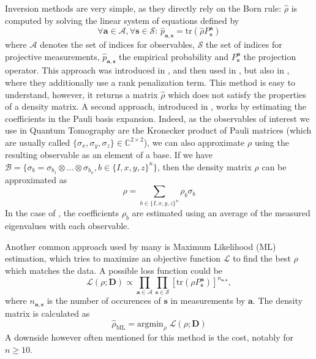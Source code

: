\documentclass[12pt]{memoir}
\newcommand{\tr}{\text{tr}}
\newcommand{\mb}{\mathbf}
\begin{document}
Inversion methods are very simple, as they directly rely on the Born rule: $\hat \rho$ is computed by solving the linear system of equations defined by 
\begin{equation*} \label{eq:inversion-method}
        \forall \mb a \in \mathcal{A},\forall \mb s \in \mathcal{S}: \, \hat p_{\mb a, \mb s} = \tr(\hat \rho P^{\mb a}_{\mb s})
\end{equation*}
where $\mathcal{A}$ denotes the set of indices for observables, $\mathcal{S}$ the set of indices for projective measurements, $\hat p_{\mb a,\mb s}$ the empirical probability and $P^{\mb a}_{\mb s}$ the projection operator. This approach was introduced in \cite{meth:linear-inversion:vogel-risken}, and then used in \cite{meth:linear-inversion:RMH}, but also in \cite{meth:linear-inversion:alquier}, where they additionally use a rank penalization term. This method is easy to understand, however, it returns a matrix $\hat \rho$ which does not satisfy the properties of a density matrix.\medbreak
A second approach, introduced in \cite{Cai-2016}, works by estimating the coefficients in the Pauli basis expansion. Indeed, as the observables of interest we use in Quantum Tomography are the Kronecker product of Pauli matrices (which are usually called $\{\sigma_x, \sigma_y, \sigma_z\} \in \mathbb{C}^{2\times 2}$), we can also approximate $\rho$ using the resulting observable as an element of a base. If we have $\mathcal{B} = \{\sigma_b = \sigma_{b_1} \otimes \dots \otimes \sigma_{b_n}, b \in \{I,x,y,z\}^n\}$, then the density matrix $\rho$ can be approximated as 
\begin{equation}
    \rho = \sum_{b\in\{I,x,y,z\}^n} \rho_b \sigma_b
\end{equation}
In the case of \cite{Cai-2016}, the coefficients $\rho_b$ are estimated using an average of the measured eigenvalues with each observable.\medbreak

Another common approach used by many \cite{Guta20,meth:ML:BDP,meth:ML:JKMW,meth:ML:Lvovsky,meth:ML:Blume-Kohout,meth:ML:Suzuki,meth:ML:Hradil2004} is Maximum Likelihood (ML) estimation, which tries to maximize an objective function $\mathcal{L}$ to find the best $\rho$ which matches the data. A possible loss function could be 
\begin{equation}
\mathcal{L}(\rho ; \mb{D}) \propto \prod_{\mb a \in \mathcal{A}} \prod_{\mb s \in \mathcal{S}}\left[\tr\left(\rho P_{\mb{s}}^{\mb{a}}\right)\right]^{n_{{\mb a}, {\mb s}}},
\end{equation}
where $n_{\mb a,\mb s}$ is the number of occurences of $\mb s$ in measurements by $\mb a$. The density matrix is calculated as 
\begin{equation}
    \hat \rho_{\text{ML}} = \text{argmin}_{\rho} \;\mathcal{L}(\rho;\mb{D})
\end{equation}
A downside however often mentioned for this method is the cost, notably for $n\geq10$.
\medbreak
\end{document}
